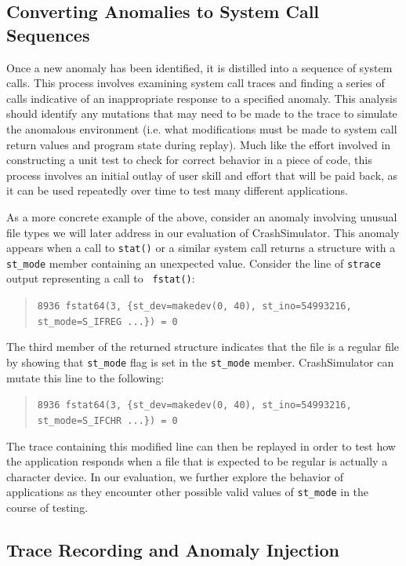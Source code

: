 \subsection{Converting Anomalies to System Call Sequences}

Once a new anomaly has been identified, it is distilled into a sequence of
system calls.  This process involves examining
system call traces and finding a series of calls indicative of
an inappropriate response to a specified anomaly.  This analysis should
identify any mutations that may need to be made to the trace
to simulate the anomalous environment (i.e. what modifications must be made
to system call return values and program state during replay).  Much like
the effort involved in constructing a unit test to check for correct
behavior in a piece of code, this process involves an initial outlay of
user skill and effort that will be paid back, as it can be
used repeatedly over time to test many different applications.

As a more concrete example of the above, consider an anomaly
involving unusual file types we will later address in our evaluation of
CrashSimulator.  This anomaly appears when a call to {\tt stat()} or a similar system
call returns a structure with a {\tt st\_mode} member containing an unexpected
value. Consider the line of {\tt strace} output representing a call to {\tt
  fstat()}:
\begin{quote}
  {\tt 8936  fstat64(3, \{st\_dev=makedev(0, 40), st\_ino=54993216, st\_mode=S\_IFREG ...\}) = 0}
\end{quote}
The third member of the returned structure indicates that the file is a
regular file by showing that {\tt st\_mode} flag is set in the {\tt st\_mode}
member.  CrashSimulator can mutate this  line to the following:

\begin{quote}
  {\tt 8936  fstat64(3, \{st\_dev=makedev(0, 40), st\_ino=54993216, st\_mode=S\_IFCHR ...\}) = 0}
\end{quote}

The trace containing this modified line can then be replayed in order to
test how the application responds when a file that is expected to be
regular is actually a character device. In our evaluation, we further
explore the behavior of applications as they encounter other possible valid
values of {\tt st\_mode} in the course of testing.


\subsection{Trace Recording and Anomaly Injection}


